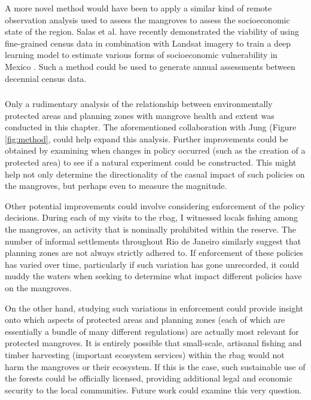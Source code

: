A more novel method would have been to apply a similar kind of remote observation analysis used to assess the mangroves to assess the socioeconomic state of the region. Salas et al. have recently demonstrated the viability of using fine-grained census data in combination with Landsat imagery to train a deep learning model to estimate various forms of socioeconomic vulnerability in Mexico \cite{salasFineGrainedLargeScaleVulnerable2021}. Such a method could be used to generate annual assessments between decennial census data.

\subsubsection{}

Only a rudimentary analysis of the relationship between environmentally protected areas and planning zones with mangrove health and extent was conducted in this chapter. The aforementioned collaboration with Jung (Figure \ref{fig:method}, could help expand this analysis. Further improvements could be obtained by examining when changes in policy occurred (such as the creation of a protected area) to see if a natural experiment could be constructed. This might help not only determine the directionality of the casual impact of such policies on the mangroves, but perhaps even to measure the magnitude. 

Other potential improvements could involve considering enforcement of the policy decisions. During each of my visits to the \ac{rbag}, I witnessed locals fishing among the mangroves, an activity that is nominally prohibited within the reserve. The number of informal settlements throughout Rio de Janeiro similarly suggest that planning zones are not always strictly adhered to. If enforcement of these policies has varied over time, particularly if such variation has gone unrecorded, it could muddy the waters when seeking to determine what impact different policies have on the mangroves.

On the other hand, studying such variations in enforcement could provide insight onto which aspects of protected areas and planning zones (each of which are essentially a bundle of many different regulations) are actually most relevant for protected mangroves. It is entirely possible that small-scale, artisanal fishing and timber harvesting (important ecosystem services) within the \ac{rbag} would not harm the mangroves or their ecosystem. If this is the case, such sustainable use of the forests could be officially licensed, providing additional legal and economic security to the local communities. Future work could examine this very question.

